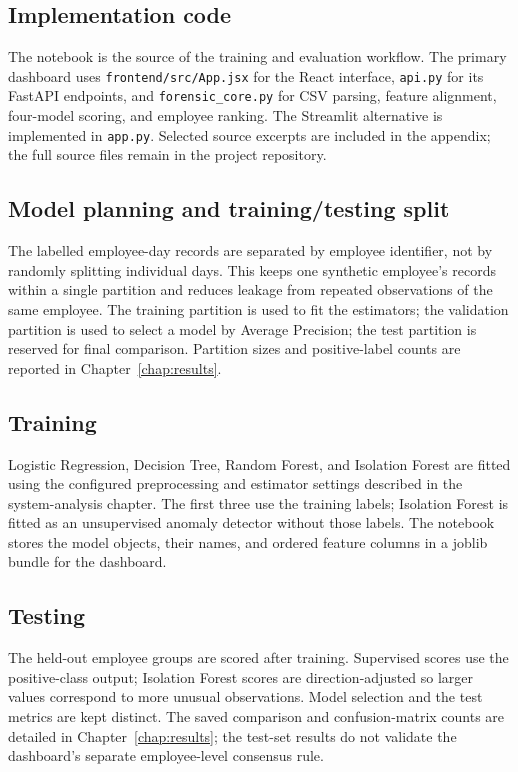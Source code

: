 \documentclass[12pt,a4paper,oneside]{report}
\begin{document}
\subsection{Implementation code}
The notebook is the source of the training and evaluation workflow.
The primary dashboard uses \texttt{frontend/src/App.jsx} for the React
interface, \texttt{api.py} for its FastAPI endpoints, and
\texttt{forensic\_core.py} for CSV parsing, feature alignment,
four-model scoring, and employee ranking. The Streamlit alternative is
implemented in \texttt{app.py}. Selected source excerpts are included in
the appendix; the full source files remain in the project repository.

\subsection{Model planning and training/testing split}
The labelled employee-day records are separated by employee identifier,
not by randomly splitting individual days. This keeps one synthetic
employee's records within a single partition and reduces leakage from
repeated observations of the same employee. The training partition is
used to fit the estimators; the validation partition is used to select a
model by Average Precision; the test partition is reserved for final
comparison. Partition sizes and positive-label counts are reported in
Chapter~\ref{chap:results}.

\subsection{Training}
Logistic Regression, Decision Tree, Random Forest, and Isolation Forest
are fitted using the configured preprocessing and estimator settings
described in the system-analysis chapter. The first three use the
training labels; Isolation Forest is fitted as an unsupervised anomaly
detector without those labels. The notebook stores the model objects,
their names, and ordered feature columns in a joblib bundle for the
dashboard.

\subsection{Testing}
The held-out employee groups are scored after training. Supervised
scores use the positive-class output; Isolation Forest scores are
direction-adjusted so larger values correspond to more unusual
observations. Model selection and the test metrics are kept distinct.
The saved comparison and confusion-matrix counts are detailed in
Chapter~\ref{chap:results}; the test-set results do not validate the
dashboard's separate employee-level consensus rule.
\end{document}
